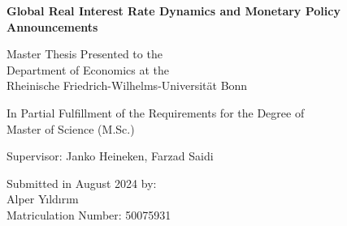 \begin{titlepage}
    \begin{center}
        \vspace*{2cm}
            
        \LARGE
        \textbf{Global Real Interest Rate Dynamics and Monetary Policy Announcements}
            
        \vspace{3cm}

        \large
        Master Thesis Presented to the \\ Department of Economics at the \\
        Rheinische Friedrich-Wilhelms-Universität Bonn

        \vspace{1.5cm}

        In Partial Fulfillment of the Requirements for the Degree of \\
        Master of Science (M.Sc.)

        \vfill

        Supervisor: Janko Heineken, Farzad Saidi

        \vspace{1cm}

        Submitted in August 2024 by:\\
        Alper Yıldırım \\
        Matriculation Number: 50075931
            
    \end{center}
\end{titlepage}